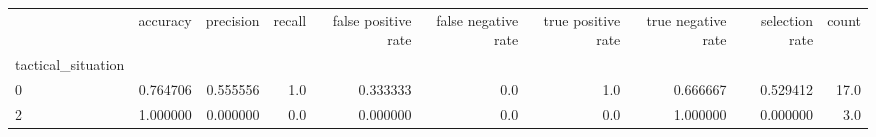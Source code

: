 \begin{tabular}{lrrrrrrrrr}
\toprule
{} &  accuracy &  precision &  recall &  false positive rate &  false negative rate &  true positive rate &  true negative rate &  selection rate &  count \\
tactical\_situation &           &            &         &                      &                      &                     &                     &                 &        \\
\midrule
0                  &  0.764706 &   0.555556 &     1.0 &             0.333333 &                  0.0 &                 1.0 &            0.666667 &        0.529412 &   17.0 \\
2                  &  1.000000 &   0.000000 &     0.0 &             0.000000 &                  0.0 &                 0.0 &            1.000000 &        0.000000 &    3.0 \\
\bottomrule
\end{tabular}
